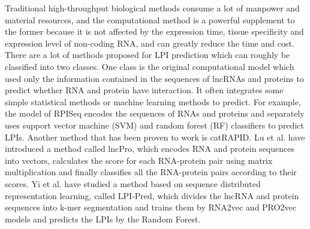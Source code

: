 \documentclass[fleqn,10pt]{wlscirep}
\begin{document}
Traditional high-throughput biological methods consume a lot of manpower and material resources, and the computational method is a powerful supplement to the former because it is not affected by the expression time, tissue specificity and expression level of non-coding RNA, and can greatly reduce the time and cost. There are a lot of methods proposed for LPI prediction which can roughly be classified into two classes. One class is the original computational model which used only the information contained in the sequences of lncRNAs and proteins to predict whether RNA and protein have interaction. It often integrates some simple statistical methods or machine learning methods to predict. For example, the model of RPISeq encodes the sequences of RNAs and proteins and separately uses support vector machine (SVM) and random forest (RF) classifiers to predict LPIs\cite{Muppirala2011}. Another method that has been proven to work is catRAPID\cite{Bellucci2011}. Lu et al. have introduced a method called lncPro, which encodes RNA and protein sequences into vectors, calculates the score for each RNA-protein pair using matrix multiplication and finally classifies all the RNA-protein pairs according to their scores\cite{Lu2013}. Yi et al. have studied a method based on sequence distributed representation learning, called LPI-Pred, which divides the lncRNA and protein sequences into k-mer segmentation and trains them by RNA2vec and PRO2vec models and predicts the LPIs by the Random Forest\cite{Yi2020a}.
\end{document}
